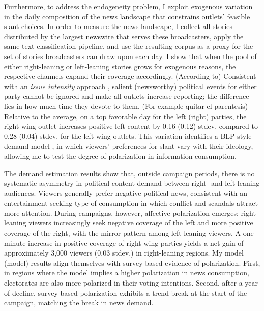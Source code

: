 \documentclass[12pt]{article}
\begin{document}
	
	Furthermore, to address the endogeneity problem, I exploit exogenous variation in the daily composition of the news landscape that  constrains outlets’ feasible slant choices. In order to measure the news landscape, I collect all stories distributed by the largest newswire that serves these broadcasters, apply the same text-classification pipeline, and use the resulting corpus as  a proxy for the set of stories broadcasters can draw upon each day. I show that  when the pool of either right-leaning or left-leaning  stories grows for exogenous reasons, the respective channels expand  their coverage accordingly. (According to) Consistent with an \emph{issue intensity} approach \citep{puglisi_review}, salient (newsworthy) political events for either party cannot be ignored and make all outlets increase reporting; the difference lies in how much time they devote to them. (For example quitar el parentesis) Relative to the average, on a top favorable day for the left (right) parties, the right-wing outlet increases positive left content by 0.16 (0.12) stdev. compared to 0.28 (0.04) stdev. for the left-wing outlets. This variation identifies a BLP-style demand model \citep{berry_blp}, in which viewers’ preferences for slant vary with their ideology, allowing me to test the degree of polarization in information consumption. 
	
	
	
	
	
	
	
	The demand estimation results show that, outside campaign periods, there is no systematic asymmetry in political content demand between right- and left-leaning audiences. Viewers generally prefer negative political news, consistent with an entertainment-seeking type of consumption in which conflict and scandals attract more attention. During campaigns, however, affective polarization emerges: right-leaning viewers increasingly seek negative coverage of the left and more positive coverage of the right, with the mirror pattern among left-leaning viewers. A one-minute increase in positive coverage of right-wing parties yields a net gain of approximately 3,000 viewers (0.03 stdev.)  in right-leaning regions. My model (model)  results align themselves with survey-based evidence of polarization. First, in regions where the model implies a higher polarization in news consumption, electorates are also more polarized in their voting intentions. Second, after a year of decline, survey-based polarization exhibits a trend break at the start of the campaign, matching the break in news demand.
	
\end{document}
